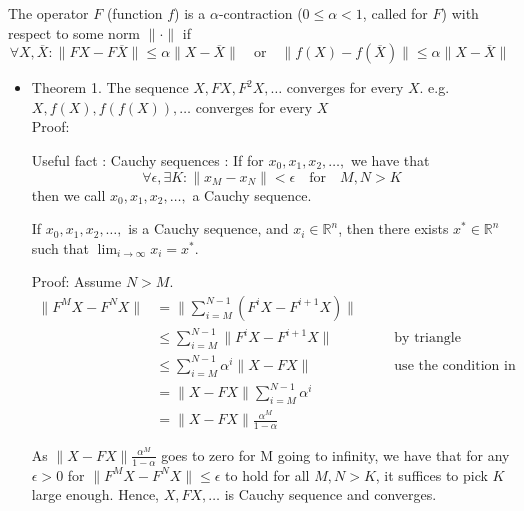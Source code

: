 \documentclass[9pt]{article}
\begin{document}
\Working


 \Working

  The operator $F$ (function $f$) is a $\alpha$-contraction  ($0\le\alpha<1$, called  for $F$) with respect to some norm $\|\cdot\|$ if
\begin{displaymath}
  \forall X,\overline{X}: \|FX-F\overline{X}\| \le \alpha \|X-\overline{X}\| \quad \text{or} \quad \|f(X)-f(\overline{X})\| \le \alpha \|X-\overline{X}\|
\end{displaymath}

\begin{itemize}
\item Theorem 1. The sequence $X, FX, F^2X, \ldots$ converges for every $X$.  e.g. $X, f(X), f(f(X)), \ldots$ converges for every $X$\\

Proof:

Useful fact : Cauchy sequences : If for $x_0,x_1,x_2,\ldots,$ we have that
\begin{displaymath}
  \forall \epsilon, \exists K : \|x_M-x_N \| < \epsilon \quad \text{for} \quad M,N > K
\end{displaymath}
then we call $x_0,x_1,x_2,\ldots,$ a Cauchy sequence.

If $x_0,x_1,x_2,\ldots,$ is a Cauchy sequence, and $x_i \in \mathbb{R}^n$, then there exists $x^* \in \mathbb{R}^n$ such that $\lim_{i \to \infty}x_i = x^*$.

Proof:
Assume $N > M$.
\begin{displaymath}
  \begin{alignedat}{2} %
  \| F^MX-F^NX \| & = \| \sum_{i=M}^{N-1}(F^iX-F^{i+1}X)\| & &\\
  & \le \sum_{i=M}^{N-1} \| F^iX-F^{i+1}X \|  & &\quad \text{by triangle inequality}\\
  & \le \sum_{i=M}^{N-1} \alpha ^{i} \| X-FX\|  & &\quad \text{use the condition in Theorem}\\
  & = \| X-FX \| \sum_{i=M}^{N-1}\alpha^i & &\\
  & = \| X-FX \| \frac{\alpha^M}{1-\alpha} & &
  \end{alignedat}
\end{displaymath}

As $\| X-FX \| \frac{\alpha^M}{1-\alpha}$ goes to zero for M going to infinity, we have that for any $\epsilon > 0$ for $\|F^MX-F^NX\| \le \epsilon$ to hold for all $M,N>K$, it suffices to pick $K$ large enough. Hence, $X,FX,\ldots$ is Cauchy sequence and converges.


\end{itemize}
\end{document}
